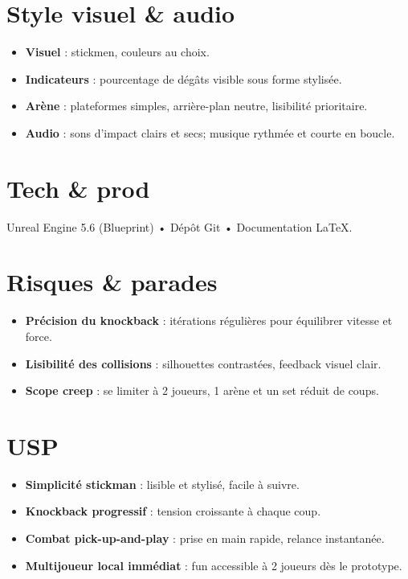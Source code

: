 \documentclass[10.8pt,letterpaper]{article}
\begin{document}
\begin{multicols}{2}
\section*{Style visuel \& audio}
\begin{itemize}
  \item \textbf{Visuel} : stickmen, couleurs au choix.
  \item \textbf{Indicateurs} : pourcentage de dégâts visible sous forme stylisée.
  \item \textbf{Arène} : plateformes simples, arrière-plan neutre, lisibilité prioritaire.
  \item \textbf{Audio} : sons d’impact clairs et secs; musique rythmée et courte en boucle.
\end{itemize}

\section*{Tech \& prod}
Unreal Engine 5.6 (Blueprint) • Dépôt Git • Documentation \LaTeX{}.

\section*{Risques \& parades}
\begin{itemize}
  \item \textbf{Précision du knockback} : itérations régulières pour équilibrer vitesse et force.
  \item \textbf{Lisibilité des collisions} : silhouettes contrastées, feedback visuel clair.
  \item \textbf{Scope creep} : se limiter à 2 joueurs, 1 arène et un set réduit de coups.
\end{itemize}

\section*{USP}
\begin{itemize}
  \item \textbf{Simplicité stickman} : lisible et stylisé, facile à suivre.
  \item \textbf{Knockback progressif} : tension croissante à chaque coup.
  \item \textbf{Combat pick-up-and-play} : prise en main rapide, relance instantanée.
  \item \textbf{Multijoueur local immédiat} : fun accessible à 2 joueurs dès le prototype.
\end{itemize}

\end{multicols}
\end{document}
